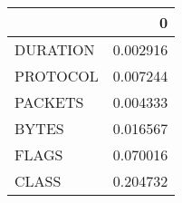 \begin{tabular}{lr}
\toprule
{} &         0 \\
\midrule
DURATION &  0.002916 \\
PROTOCOL &  0.007244 \\
PACKETS  &  0.004333 \\
BYTES    &  0.016567 \\
FLAGS    &  0.070016 \\
CLASS    &  0.204732 \\
\bottomrule
\end{tabular}

